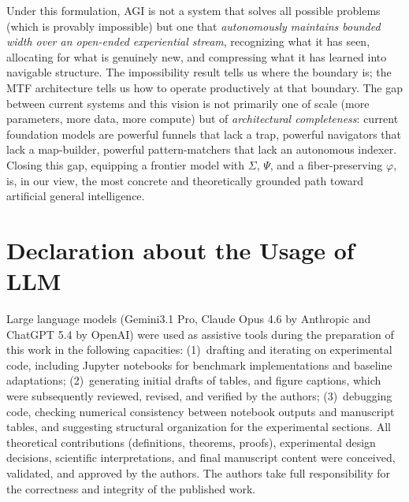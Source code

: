 \documentclass{article}
\begin{document}
Under this formulation, AGI is not a system that solves all possible problems (which is provably impossible) but one that \emph{autonomously maintains bounded width over an open-ended experiential stream}, recognizing what it has seen, allocating for what is genuinely new, and compressing what it has learned into navigable structure.
The impossibility result tells us where the boundary is; the MTF architecture tells us how to operate productively at that boundary.
The gap between current systems and this vision is not primarily one of scale (more parameters, more data, more compute) but of \emph{architectural completeness}: current foundation models are powerful funnels that lack a trap, powerful navigators that lack a map-builder, powerful pattern-matchers that lack an autonomous indexer.
Closing this gap, equipping a frontier model with $\Sigma$, $\Psi$, and a fiber-preserving $\varphi$, is, in our view, the most concrete and theoretically grounded path toward artificial general intelligence.

\section{Declaration about the Usage of LLM}

Large language models (Gemini3.1 Pro, Claude Opus 4.6 by Anthropic and ChatGPT 5.4 by OpenAI) were used as assistive tools during the preparation of this work in the following capacities:
(1)~drafting and iterating on experimental code, including Jupyter notebooks for benchmark implementations and baseline adaptations;
(2)~generating initial drafts of tables, and figure captions, which were subsequently reviewed, revised, and verified by the authors;
(3)~debugging code, checking numerical consistency between notebook outputs and manuscript tables, and suggesting structural organization for the experimental sections.
All theoretical contributions (definitions, theorems, proofs), experimental design decisions, scientific interpretations, and final manuscript content were conceived, validated, and approved by the authors.
The authors take full responsibility for the correctness and integrity of the published work.

%
\end{document}
